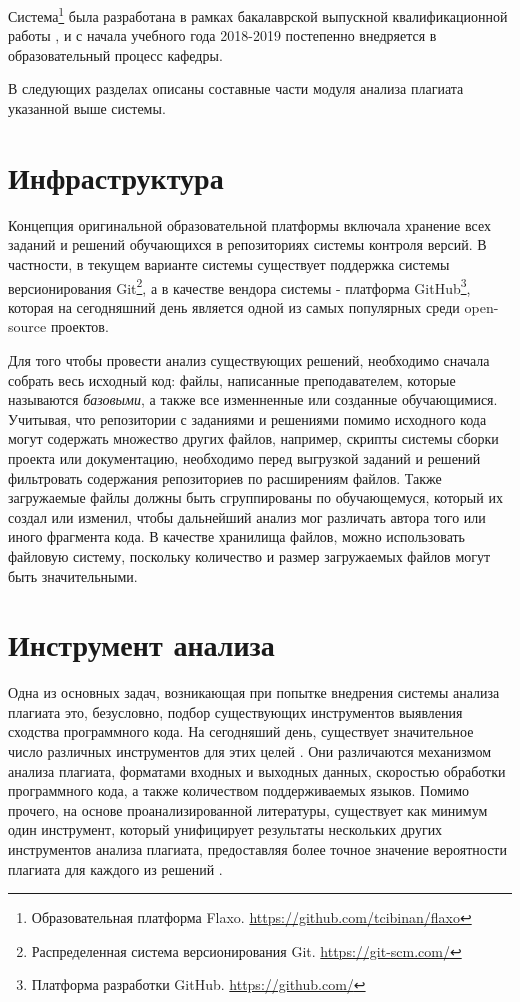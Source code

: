 \documentclass{article}
\begin{document}
Система\footnote{Образовательная платформа Flaxo. \url{https://github.com/tcibinan/flaxo}} была разработана в рамках бакалаврской выпускной квалификационной работы \citep{flaxoThesis}, и с начала учебного года 2018-2019 постепенно внедряется в образовательный процесс кафедры.

В следующих разделах описаны составные части модуля анализа плагиата указанной выше системы.

\section{Инфраструктура}

Концепция оригинальной образовательной платформы включала хранение всех заданий и решений обучающихся в репозиториях системы контроля версий. В частности, в текущем варианте системы существует поддержка системы версионирования Git\footnote{Распределенная система версионирования Git. \url{https://git-scm.com/}}, а в качестве вендора системы - платформа GitHub\footnote{Платформа разработки GitHub. \url{https://github.com/}}, которая на сегодняшний день является одной из самых популярных среди open-source проектов.

Для того чтобы провести анализ существующих решений, необходимо сначала собрать весь исходный код: файлы, написанные преподавателем, которые называются \textit{базовыми}, а также все изменненные или созданные обучающимися. Учитывая, что репозитории с заданиями и решениями помимо исходного кода могут содержать множество других файлов, например, скрипты системы сборки проекта или документацию, необходимо перед выгрузкой заданий и решений фильтровать содержания репозиториев по расширениям файлов. Также загружаемые файлы должны быть сгруппированы по обучающемуся, который их создал или изменил, чтобы дальнейший анализ мог различать автора того или иного фрагмента кода. В качестве хранилища файлов, можно использовать файловую систему, поскольку количество и размер загружаемых файлов могут быть значительными.

\section{Инструмент анализа}

Одна из основных задач, возникающая при попытке внедрения системы анализа плагиата это, безусловно, подбор существующих инструментов выявления сходства программного кода. На сегодняший день, существует значительное число различных инструментов для этих целей \citep{plagiarismToolsSurvey}. Они различаются механизмом анализа плагиата, форматами входных и выходных данных, скоростью обработки программного кода, а также количеством поддерживаемых языков. Помимо прочего, на основе проанализированной литературы, существует как минимум один инструмент, который унифицирует результаты нескольких других инструментов анализа плагиата, предоставляя более точное значение вероятности плагиата для каждого из решений \citep{unifiedPlagiarismDetectionTool}.
\end{document}
